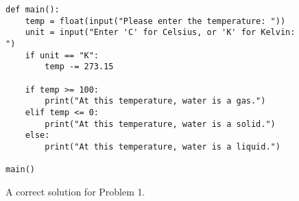 \begin{figure}[ht]
\begin{lstlisting}[numbers=none]
def main():
    temp = float(input("Please enter the temperature: "))
    unit = input("Enter 'C' for Celsius, or 'K' for Kelvin: ")
    if unit == "K":
        temp -= 273.15
    
    if temp >= 100:
        print("At this temperature, water is a gas.")
    elif temp <= 0:
        print("At this temperature, water is a solid.")
    else:
        print("At this temperature, water is a liquid.")

main()
\end{lstlisting}
\caption{A correct solution for Problem 1.}
\label{fig:correctp1}
\end{figure}
